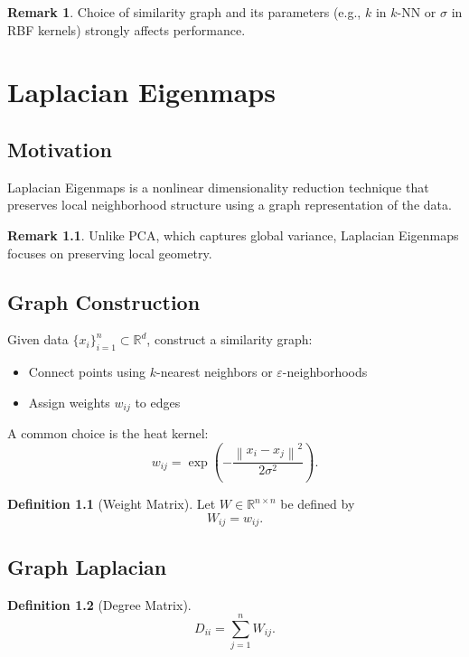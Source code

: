 \documentclass[12pt,oneside]{book}
\numberwithin{equation}{section}
\theoremstyle{definition}
\newtheorem{definition}{Definition}[section]
\newtheorem{remark}{Remark}[section]
\theoremstyle{plain}
\theoremstyle{remark}
\newcommand{\R}{\mathbb{R}}
\newcommand{\norm}[1]{\left\lVert #1 \right\rVert}
\begin{document}
\begin{remark}
Choice of similarity graph and its parameters (e.g., $k$ in $k$-NN or $\sigma$ in RBF kernels) strongly affects performance.
\end{remark}

\chapter{Laplacian Eigenmaps}

\section{Motivation}

Laplacian Eigenmaps is a nonlinear dimensionality reduction technique that preserves local neighborhood structure using a graph representation of the data.

\begin{remark}
Unlike PCA, which captures global variance, Laplacian Eigenmaps focuses on preserving local geometry.
\end{remark}

\section{Graph Construction}

Given data $\{x_i\}_{i=1}^n \subset \R^d$, construct a similarity graph:
\begin{itemize}
    \item Connect points using $k$-nearest neighbors or $\varepsilon$-neighborhoods
    \item Assign weights $w_{ij}$ to edges
\end{itemize}

A common choice is the heat kernel:
\[
w_{ij}
=
\exp\left(-\frac{\norm{x_i - x_j}^2}{2\sigma^2}\right).
\]

\begin{definition}[Weight Matrix]
Let $W \in \R^{n \times n}$ be defined by
\[
W_{ij} = w_{ij}.
\]
\end{definition}

\section{Graph Laplacian}

\begin{definition}[Degree Matrix]
\[
D_{ii} = \sum_{j=1}^n W_{ij}.
\]
\end{definition}
\end{document}
